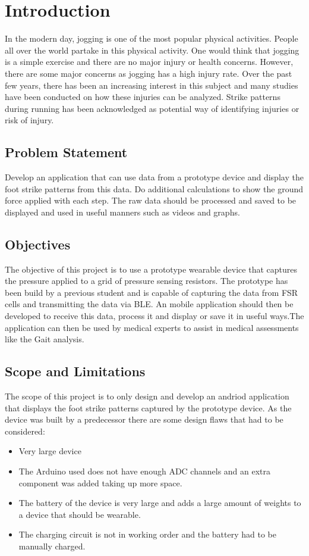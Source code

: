 \graphicspath{{introduction/fig/}}

\chapter{Introduction}
\label{chap:introduction}


In the modern day, jogging is one of the most popular physical activities. People all over the world partake in this physical activity. One would think that jogging is a simple exercise and there are no major injury or health concerns. However, there are some major concerns as jogging has a high injury rate. Over the past few years, there has been an increasing interest in this subject and many studies have been conducted on how these injuries can be analyzed. Strike patterns during running has been acknowledged as potential way of identifying injuries or risk of injury. 





\section{Problem Statement}
Develop an application that can use data from a prototype device and display the foot strike patterns from this data. Do additional calculations to show the ground force applied with each step. The raw data should be processed and saved to be displayed and used in useful manners such as videos and graphs. 
\section{Objectives}
The objective of this project is to use a prototype wearable device that captures the pressure applied to a grid of pressure sensing resistors. The prototype has been build by a previous student and is capable of capturing the data from FSR cells and transmitting the data via BLE. An mobile application should then be developed to receive this data, process it and display or save it in useful ways.The application can then be used by medical experts to assist in medical assessments like the Gait analysis. 
\section{Scope and Limitations}

The scope of this project is to only design and develop an andriod application that displays the foot strike patterns captured by the prototype device. As the device was built by a predecessor there are some design flaws that had to be considered:
\begin{itemize}
    \item Very large device
    \item The Arduino used does not have enough ADC channels and an extra component was added taking up more space. 
    \item The battery of the device is very large and adds a large amount of weights to a device that should be wearable.
    \item The charging circuit is not in working order and the battery had to be manually charged.
  \end{itemize}

